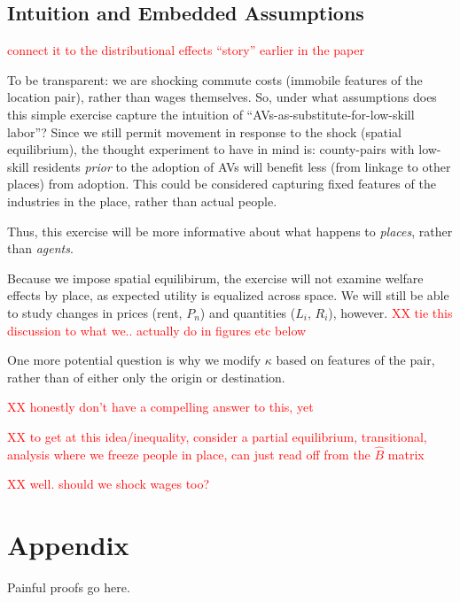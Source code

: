 \documentclass{article}
\begin{document}



\subsection{Intuition and Embedded Assumptions}
\textcolor{red}{connect it to the distributional effects ``story'' earlier in the paper}


To be transparent: we are shocking commute costs (immobile features of the location pair), rather than wages themselves. 
So, under what assumptions does this simple exercise capture the intuition of ``AVs-as-substitute-for-low-skill labor''?
Since we still permit movement in response to the shock (spatial equilibrium), the thought experiment to have in mind is: county-pairs with low-skill residents \textit{prior} to the adoption of AVs will benefit less (from linkage to other places) from adoption.
This could be considered capturing fixed features of the industries in the place, rather than actual people.

Thus, this exercise will be more informative about what happens to \textit{places}, rather than \textit{agents}.








Because we impose spatial equilibirum, the exercise will not examine welfare effects by place, as expected utility is equalized across space.
We will still be able to study changes in prices (rent, $P_n$) and quantities ($L_i$, $R_i$), however. \textcolor{red}{XX tie this discussion to what we.. actually do in figures etc below}

One more potential question is why we modify $\kappa$ based on features of the pair, rather than of either only the origin or destination.

\textcolor{red}{XX honestly don't have a compelling answer to this, yet}


\textcolor{red}{XX to get at this idea/inequality, consider a partial equilibrium, transitional, analysis where we freeze people in place, can just read off from the $\hat B$ matrix }

\textcolor{red}{XX well. should we shock wages too? }



\section{Appendix}
Painful proofs go here.


\end{document}
